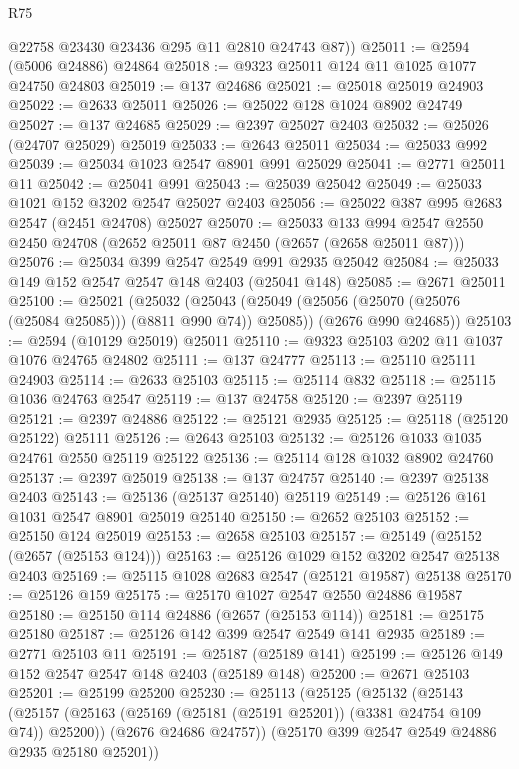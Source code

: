 \begin{lexlean}{R75}
\begin{coremodule}
        @22758
        @23430
        @23436
        @295
        @11
        @2810
        @24743
        @87))
@25011 := @2594 (@5006 @24886) @24864
@25018 := @9323 @25011 @124 @11 @1025 @1077 @24750 @24803
@25019 := @137 @24686
@25021 := @25018 @25019 @24903
@25022 := @2633 @25011
@25026 := @25022 @128 @1024 @8902 @24749
@25027 := @137 @24685
@25029 := @2397 @25027 @2403
@25032 := @25026 (@24707 @25029) @25019
@25033 := @2643 @25011
@25034 := @25033 @992
@25039 := @25034 @1023 @2547 @8901 @991 @25029
@25041 := @2771 @25011 @11
@25042 := @25041 @991
@25043 := @25039 @25042
@25049 := @25033 @1021 @152 @3202 @2547 @25027 @2403
@25056 := @25022 @387 @995 @2683 @2547 (@2451 @24708) @25027
@25070 := @25033
    @133
    @994
    @2547
    @2550
    @2450
    @24708
    (@2652 @25011 @87 @2450 (@2657 (@2658 @25011 @87)))
@25076 := @25034 @399 @2547 @2549 @991 @2935 @25042
@25084 := @25033 @149 @152 @2547 @2547 @148 @2403 (@25041 @148)
@25085 := @2671 @25011
@25100 := @25021
    (@25032
      (@25043 (@25049 (@25056 (@25070 (@25076 (@25084 @25085))) (@8811 @990 @74)) @25085))
      (@2676 @990 @24685))
@25103 := @2594 (@10129 @25019) @25011
@25110 := @9323 @25103 @202 @11 @1037 @1076 @24765 @24802
@25111 := @137 @24777
@25113 := @25110 @25111 @24903
@25114 := @2633 @25103
@25115 := @25114 @832
@25118 := @25115 @1036 @24763 @2547
@25119 := @137 @24758
@25120 := @2397 @25119
@25121 := @2397 @24886
@25122 := @25121 @2935
@25125 := @25118 (@25120 @25122) @25111
@25126 := @2643 @25103
@25132 := @25126 @1033 @1035 @24761 @2550 @25119 @25122
@25136 := @25114 @128 @1032 @8902 @24760
@25137 := @2397 @25019
@25138 := @137 @24757
@25140 := @2397 @25138 @2403
@25143 := @25136 (@25137 @25140) @25119
@25149 := @25126 @161 @1031 @2547 @8901 @25019 @25140
@25150 := @2652 @25103
@25152 := @25150 @124 @25019
@25153 := @2658 @25103
@25157 := @25149 (@25152 (@2657 (@25153 @124)))
@25163 := @25126 @1029 @152 @3202 @2547 @25138 @2403
@25169 := @25115 @1028 @2683 @2547 (@25121 @19587) @25138
@25170 := @25126 @159
@25175 := @25170 @1027 @2547 @2550 @24886 @19587
@25180 := @25150 @114 @24886 (@2657 (@25153 @114))
@25181 := @25175 @25180
@25187 := @25126 @142 @399 @2547 @2549 @141 @2935
@25189 := @2771 @25103 @11
@25191 := @25187 (@25189 @141)
@25199 := @25126 @149 @152 @2547 @2547 @148 @2403 (@25189 @148)
@25200 := @2671 @25103
@25201 := @25199 @25200
@25230 := @25113
    (@25125
      (@25132
        (@25143
          (@25157 (@25163 (@25169 (@25181 (@25191 @25201)) (@3381 @24754 @109 @74)) @25200))
          (@2676 @24686 @24757))
        (@25170 @399 @2547 @2549 @24886 @2935 @25180 @25201))

\end{coremodule}
\end{lexlean}

